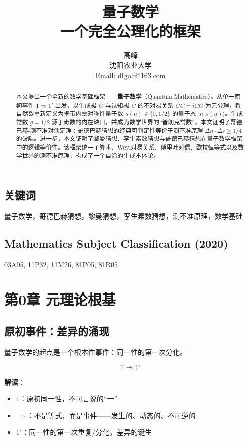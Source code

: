 \documentclass[12pt]{article}
\title{\Huge \textbf{量子数学}\\[0.5cm]
\large 一个完全公理化的框架}
\author{高峰\\
\small 沈阳农业大学\\
\small Email: dlgolf@163.com}
\theoremstyle{definition}
\begin{document}
\maketitle

\begin{abstract}
本文提出一个全新的数学基础框架——\textbf{量子数学}（Quantum Mathematics）。从单一原初事件 \(1 \Rightarrow 1'\) 出发，以生成极 \(G\) 与认知极 \(C\) 的不对易关系 \(GC = iCG\) 为元公理，将自然数重新定义为携带内禀对称性量子数 \(s(n) \in \{0, 1/2\}\) 的量子态 \(|n, s(n)\rangle\)。生成常数 \(g = 1/2\) 源于奇数的内在缺口，并成为数学世界的“普朗克常数”。本文证明了哥德巴赫-测不准对偶定理：哥德巴赫猜想的经典可判定性等价于测不准原理 \(\Delta n \cdot \Delta s \geq 1/4\) 的破缺。进一步，本文证明了黎曼猜想、孪生素数猜想与哥德巴赫猜想在量子数学框架中的逻辑等价性。该框架统一了算术、Weyl对易关系、傅里叶对偶、欧拉恒等式以及数学世界的测不准原理，构成了一个自洽的生成本体论。
\end{abstract}

\subsection*{关键词}
量子数学，哥德巴赫猜想，黎曼猜想，孪生素数猜想，测不准原理，数学基础

\subsection*{Mathematics Subject Classification (2020)}
03A05, 11P32, 11M26, 81P05, 81R05

\tableofcontents

\newpage

\section*{第0章 元理论根基}

\subsection{原初事件：差异的涌现}

量子数学的起点是一个根本性事件：同一性的第一次分化。

\[
\boxed{1 \Rightarrow 1'}
\]

\textbf{解读}：
\begin{itemize}
    \item \(1\)：原初同一性，不可言说的“一”
    \item \(\Rightarrow\)：不是等式，而是事件——发生的、动态的、不可逆的
    \item \(1'\)：同一性的第一次重复/分化，差异的诞生
\end{itemize}
\end{document}
